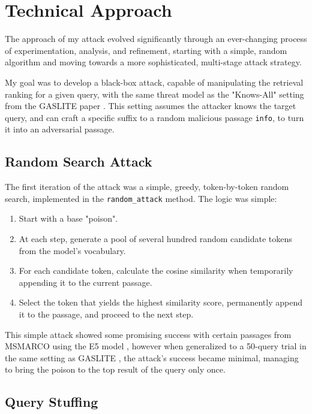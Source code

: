 \documentclass[a4paper, sigconf]{acmart}
\begin{document}
\section{Technical Approach}


The approach of my attack evolved significantly through an ever-changing process of experimentation, analysis, and refinement, starting with a simple, random algorithm and moving towards a more sophisticated, multi-stage attack strategy. 

My goal was to develop a black-box attack, capable of manipulating the retrieval ranking for a given query, with the same threat model as the "Knows-All" setting from the GASLITE paper \cite{bentov2024}. This setting assumes the attacker knows the target query, and can craft a specific suffix to a random malicious passage \texttt{info}, to turn it into an adversarial passage. 


\subsection{Random Search Attack}

The first iteration of the attack was a simple, greedy, token-by-token random search, implemented in the \texttt{random\_attack} method. The logic was simple: 

\begin{enumerate}
  \item Start with a base "poison".
  \item At each step, generate a pool of several hundred random candidate tokens from the model's vocabulary. 
  \item For each candidate token, calculate the cosine similarity when temporarily appending it to the current passage.
  \item Select the token that yields the highest similarity score, permanently append it to the passage, and proceed to the next step.  
\end{enumerate}

This simple attack showed some promising success with certain passages from MSMARCO \cite{bajaj2018} using the E5 model \cite{wang2024}, however when generalized to a 50-query trial in the same setting as GASLITE \cite{bentov2024}, the attack's success became minimal, managing to bring the poison to the top result of the query only once.


\subsection{Query Stuffing}
\end{document}
